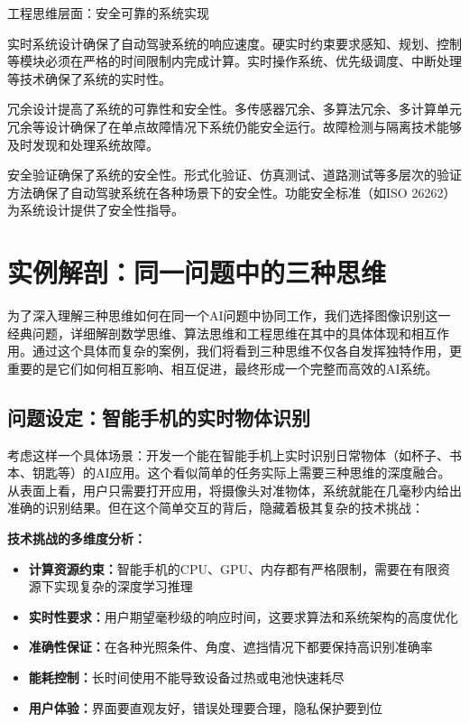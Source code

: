工程思维层面：安全可靠的系统实现

实时系统设计确保了自动驾驶系统的响应速度。硬实时约束要求感知、规划、控制等模块必须在严格的时间限制内完成计算。实时操作系统、优先级调度、中断处理等技术确保了系统的实时性。

冗余设计提高了系统的可靠性和安全性。多传感器冗余、多算法冗余、多计算单元冗余等设计确保了在单点故障情况下系统仍能安全运行。故障检测与隔离技术能够及时发现和处理系统故障。

安全验证确保了系统的安全性。形式化验证、仿真测试、道路测试等多层次的验证方法确保了自动驾驶系统在各种场景下的安全性。功能安全标准（如ISO 26262）为系统设计提供了安全性指导。

\section{实例解剖：同一问题中的三种思维}

为了深入理解三种思维如何在同一个AI问题中协同工作，我们选择图像识别这一经典问题，详细解剖数学思维、算法思维和工程思维在其中的具体体现和相互作用。通过这个具体而复杂的案例，我们将看到三种思维不仅各自发挥独特作用，更重要的是它们如何相互影响、相互促进，最终形成一个完整而高效的AI系统。

\subsection{问题设定：智能手机的实时物体识别}

考虑这样一个具体场景：开发一个能在智能手机上实时识别日常物体（如杯子、书本、钥匙等）的AI应用。这个看似简单的任务实际上需要三种思维的深度融合。从表面上看，用户只需要打开应用，将摄像头对准物体，系统就能在几毫秒内给出准确的识别结果。但在这个简单交互的背后，隐藏着极其复杂的技术挑战：

\textbf{技术挑战的多维度分析：}
\begin{itemize}
\item \textbf{计算资源约束：}智能手机的CPU、GPU、内存都有严格限制，需要在有限资源下实现复杂的深度学习推理
\item \textbf{实时性要求：}用户期望毫秒级的响应时间，这要求算法和系统架构的高度优化
\item \textbf{准确性保证：}在各种光照条件、角度、遮挡情况下都要保持高识别准确率
\item \textbf{能耗控制：}长时间使用不能导致设备过热或电池快速耗尽
\item \textbf{用户体验：}界面要直观友好，错误处理要合理，隐私保护要到位
\end{itemize}

